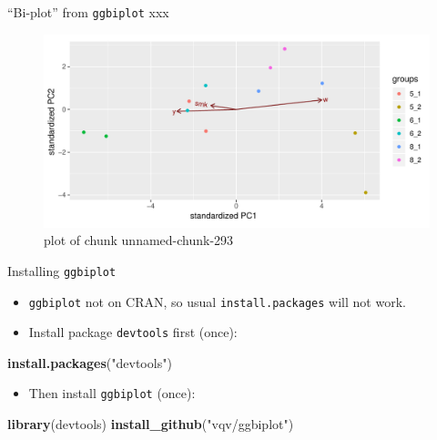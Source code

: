 \documentclass[ignorenonframetext,]{beamer}
\newenvironment{Shaded}{\begin{snugshade}}{\end{snugshade}}
\newcommand{\DataTypeTok}[1]{\textcolor[rgb]{0.13,0.29,0.53}{#1}}
\newcommand{\FloatTok}[1]{\textcolor[rgb]{0.00,0.00,0.81}{#1}}
\newcommand{\KeywordTok}[1]{\textcolor[rgb]{0.13,0.29,0.53}{\textbf{#1}}}
\newcommand{\NormalTok}[1]{#1}
\newcommand{\OperatorTok}[1]{\textcolor[rgb]{0.81,0.36,0.00}{\textbf{#1}}}
\newcommand{\StringTok}[1]{\textcolor[rgb]{0.31,0.60,0.02}{#1}}
\providecommand{\tightlist}{%
  \setlength{\itemsep}{0pt}\setlength{\parskip}{0pt}}
\begin{document}
\begin{frame}[fragile]{``Bi-plot'' from \texttt{ggbiplot} xxx}
\protect\hypertarget{bi-plot-from-ggbiplot-xxx}{}

\begin{Shaded}
\end{Shaded}

\begin{figure}
\centering
\includegraphics{figure/unnamed-chunk-293-1.pdf}
\caption{plot of chunk unnamed-chunk-293}
\end{figure}

\end{frame}

\begin{frame}[fragile]{Installing \texttt{ggbiplot}}
\protect\hypertarget{installing-ggbiplot}{}

\begin{itemize}
\item
  \texttt{ggbiplot} not on CRAN, so usual \texttt{install.packages} will
  not work.
\item
  Install package \texttt{devtools} first (once):
\end{itemize}

\begin{Shaded}
\begin{Highlighting}[]
\KeywordTok{install.packages}\NormalTok{(}\StringTok{"devtools"}\NormalTok{)}
\end{Highlighting}
\end{Shaded}

\begin{itemize}
\tightlist
\item
  Then install \texttt{ggbiplot} (once):
\end{itemize}

\begin{Shaded}
\begin{Highlighting}[]
\KeywordTok{library}\NormalTok{(devtools)}
\KeywordTok{install_github}\NormalTok{(}\StringTok{"vqv/ggbiplot"}\NormalTok{)}
\end{Highlighting}
\end{Shaded}

\end{frame}
\end{document}
